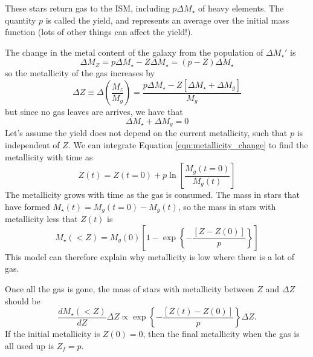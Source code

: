 \documentclass[]{article}
\begin{document}
These stars return gas to the ISM, including $p\Delta M_\star$ of
heavy elements.  The quantity $p$ is called the yield, and
represents an average over the initial mass function (lots of
other things can affect the yield!).

The change in the metal content of the galaxy from the population
of $\Delta M_\star'$ is
\begin{equation}
\Delta M_Z = p \Delta M_\star - Z \Delta M_\star = (p-Z)\Delta M_\star
\end{equation}
\noindent
so the metallicity of the gas increases by
\begin{equation}
\label{eqn:metallicity_change}
\Delta Z \equiv \Delta \left(\frac{M_z}{M_g}\right) = \frac{p\Delta M_\star - Z[\Delta M_\star + \Delta M_g]}{M_g}
\end{equation}
\noindent
but since no gas leaves are arrives, we have that
\begin{equation}
\Delta M_\star + \Delta M_g = 0
\end{equation}
\noindent
Let's assume the yield does not depend on the current metallicity, such that $p$ is independent of $Z$.
We can integrate Equation \ref{eqn:metallicity_change} to find the metallicity with time as
\begin{equation}
\label{eqn:metallicity}
Z(t) = Z(t=0) + p \ln\left[\frac{M_g(t=0)}{M_g(t)}\right]
\end{equation}
The metallicity grows with time as the gas is consumed.  The mass in stars that have
formed $M_\star(t) = M_g(t=0) - M_g(t)$, so the mass in stars with metallicity
less that $Z(t)$ is
\begin{equation}
M_\star(<Z) = M_g(0)\left[1 - \exp\left\{-\frac{[Z-Z(0)]}{p}\right\}\right]
\end{equation}
\noindent
This model can therefore explain why metallicity is low where there is a lot of gas.

Once all the gas is gone, the mass of stars with metallicity between $Z$ and $\Delta Z$
should be
\begin{equation}
\frac{dM_\star(<Z)}{dZ} \Delta Z \propto \exp\left\{-\frac{[Z(t)-Z(0)]}{p}\right\}\Delta Z.
\end{equation}
\noindent
If the initial metallicity is $Z(0)=0$, then the final metallicity when the gas
is all used up is $Z_f = p$.
\end{document}
